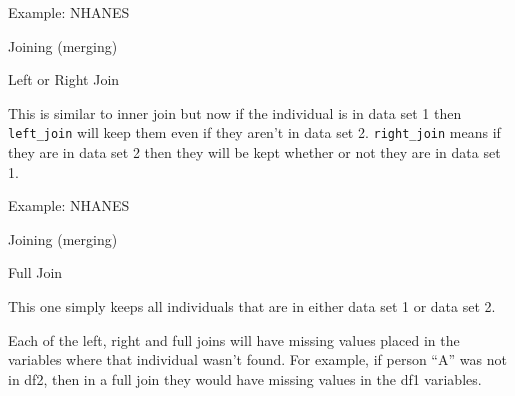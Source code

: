 \begin{frame}[fragile]{Example: NHANES}

\begin{block}{Joining (merging)}

\begin{block}{Left or Right Join}

This is similar to inner join but now if the individual is in data set 1
then \texttt{left\_join} will keep them even if they aren't in data set
2. \texttt{right\_join} means if they are in data set 2 then they will
be kept whether or not they are in data set 1.

\begin{Shaded}
\begin{Highlighting}[]
\end{Highlighting}
\end{Shaded}

\end{block}

\end{block}

\end{frame}

\begin{frame}[fragile]{Example: NHANES}

\begin{block}{Joining (merging)}

\begin{block}{Full Join}

This one simply keeps all individuals that are in either data set 1 or
data set 2.

\begin{Shaded}
\begin{Highlighting}[]
\NormalTok{)}
\end{Highlighting}
\end{Shaded}

Each of the left, right and full joins will have missing values placed
in the variables where that individual wasn't found. For example, if
person ``A'' was not in df2, then in a full join they would have missing
values in the df1 variables.

\end{block}

\end{block}

\end{frame}


